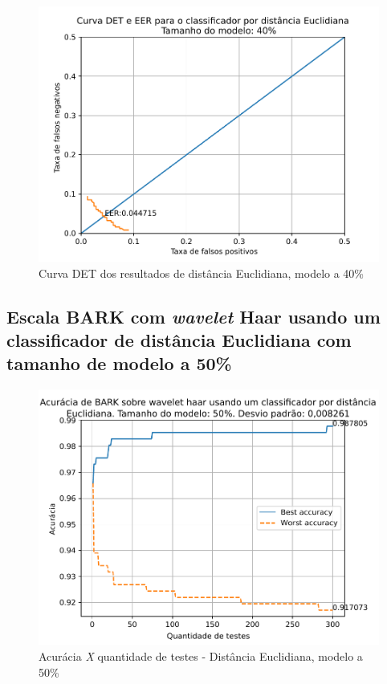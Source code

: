 			\begin{figure}[!ht]
				\centering
				\includegraphics[width=.6\linewidth]{images/results/det/DET_for_classifier_Euclidian_40}
				\caption{Curva DET dos resultados de distância Euclidiana, modelo a 40\%}
				\label{fig:detforclassifiereuclidian40}
			\end{figure}

			\FloatBarrier
		\subsection{Escala BARK com \textit{wavelet} Haar usando um classificador de distância Euclidiana com tamanho de modelo a 50\%}
		
			
			
			\begin{figure}[!ht]
				\centering
				\includegraphics[width=.6\linewidth]{images/results/confusionMatrices/classifier_Euclidian_50}
				\caption{Acurácia \textit{X} quantidade de testes - Distância Euclidiana, modelo a 50\%}
				\label{fig:classifiereuclidian50}
			\end{figure}
		
